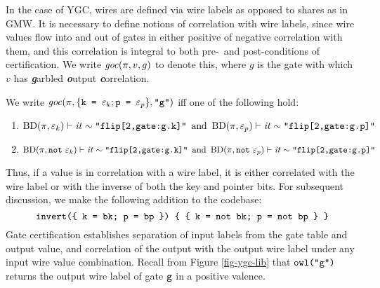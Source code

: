 In the case of YGC, wires are defined via wire labels as opposed
to shares as in GMW. It is necessary to define notions of correlation with wire
labels, since wire values flow into and out of gates in either
positive of negative correlation with them, and this correlation is
integral to both pre-~and post-conditions of certification. We
write $\mathit{goc}(\pi,v,g)$ to denote this, where $g$
is the gate with which $v$ has \emph{\bf g}arbled \emph{\bf o}utput
\emph{\bf c}orrelation.
\begin{definition} 
  \label{definition-gc}
  We write $\mathit{goc}(\pi,\{ \texttt{k = }\varepsilon_{k}; \texttt{p = }\varepsilon_{p} \},\texttt{"g"})$ iff one of the
  following hold:
  \begin{enumerate}[\hspace{2mm}i.]
  \item $\vc{\progtt(\prog,\be_k)}{\itv}{\ttt{"flip[2,gate:g.k]"}}\ \, \text{and} \ \,
    \vc{\progtt(\prog,\be_p)}{\itv}{\ttt{"flip[2,gate:g.p]"}}$
  \item $\vc{\progtt(\prog,\enot\ \be_k)}{\itv}{\ttt{"flip[2,gate:g.k]"}}\ \, \text{and} \ \,
    \vc{\progtt(\prog,\enot\ \be_p)}{\itv}{\ttt{"flip[2,gate:g.p]"}}$
  \end{enumerate}
\end{definition}
Thus, if a value is in correlation with a wire label, it is either
correlated with the wire label or with the inverse of both the key and
pointer bits. For subsequent discussion, we make the following addition
to the codebase:
$$
\texttt{invert(\{ k = bk; p = bp \}) \{ \{ k = not bk; p = not bp \} \}}
$$
Gate certification establishes separation of input labels from the
gate table and output value, and correlation of the output with
the output wire label under any input wire value combination.
Recall from Figure \ref{fig-ygc-lib} that $\texttt{owl("g")}$ returns
the output wire label of gate $\texttt{g}$ in a positive valence.
